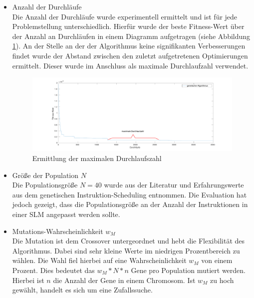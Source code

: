 \begin{itemize}
	\item Anzahl der Durchläufe\\
		Die Anzahl der Durchläufe wurde experimentell ermittelt und ist für jede Problemstellung unterschiedlich. Hierfür wurde der beste Fitness-Wert über der Anzahl an Durchläufen in einem Diagramm aufgetragen (siehe Abbildung \ref{fig:iteration_analyse}). An der Stelle an der der Algorithmus keine signifikanten Verbesserungen findet wurde der Abstand zwischen den zuletzt aufgetretenen Optimierungen ermittelt. Dieser wurde im Anschluss als maximale Durchlaufzahl verwendet.
		
		\begin{figure}[H]
			\centering
			\includegraphics[width=\textwidth]{fig/iteration_analyse.pdf}
			\caption{Ermittlung der maximalen Durchlaufszahl}
			\label{fig:iteration_analyse}
		\end{figure}
	
	\item Größe der Population $N$\\
		Die Populationsgröße $N = 40$ wurde aus der Literatur \cite{grefenstette1986optimization} und Erfahrungswerte aus dem genetischen Instruktion-Scheduling entnommen. Die Evaluation hat jedoch gezeigt, dass die Populationsgröße an der Anzahl der Instruktionen in einer SLM angepasst werden sollte. 
	
	\item Mutations-Wahrscheinlichkeit $w_M$\\
		Die Mutation ist dem Crossover untergeordnet und hebt die Flexibilität des Algorithmus. Dabei sind sehr kleine Werte im niedrigen Prozentbereich zu wählen. Die Wahl fiel hierbei auf eine Wahrscheinlichkeit $w_M$ von einem Prozent. Dies bedeutet das $w_M * N * n$ Gene pro Population mutiert werden. Hierbei ist $n$ die Anzahl der Gene in einem Chromosom. Ist $w_M$ zu hoch gewählt, handelt es sich um eine Zufallssuche.
		

\end{itemize}
